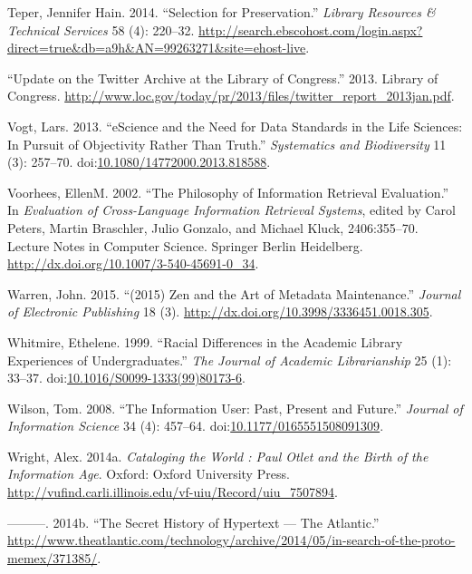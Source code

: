 \documentclass[]{article}
\begin{document}
\hypertarget{ref-teperux5fselectionux5f2014}{}
Teper, Jennifer Hain. 2014. ``Selection for Preservation.''
\emph{Library Resources \& Technical Services} 58 (4): 220--32.
\url{http://search.ebscohost.com/login.aspx?direct=true\&db=a9h\&AN=99263271\&site=ehost-live}.

\hypertarget{ref-ux5fupdateux5f2013}{}
``Update on the Twitter Archive at the Library of Congress.'' 2013.
Library of Congress.
\url{http://www.loc.gov/today/pr/2013/files/twitter_report_2013jan.pdf}.

\hypertarget{ref-vogtux5fescienceux5f2013}{}
Vogt, Lars. 2013. ``eScience and the Need for Data Standards in the Life
Sciences: In Pursuit of Objectivity Rather Than Truth.''
\emph{Systematics and Biodiversity} 11 (3): 257--70.
doi:\href{https://doi.org/10.1080/14772000.2013.818588}{10.1080/14772000.2013.818588}.

\hypertarget{ref-petersux5fphilosophyux5f2002}{}
Voorhees, EllenM. 2002. ``The Philosophy of Information Retrieval
Evaluation.'' In \emph{Evaluation of Cross-Language Information
Retrieval Systems}, edited by Carol Peters, Martin Braschler, Julio
Gonzalo, and Michael Kluck, 2406:355--70. Lecture Notes in Computer
Science. Springer Berlin Heidelberg.
\url{http://dx.doi.org/10.1007/3-540-45691-0_34}.

\hypertarget{ref-warrenux5f2015ux5f2015}{}
Warren, John. 2015. ``(2015) Zen and the Art of Metadata Maintenance.''
\emph{Journal of Electronic Publishing} 18 (3).
\url{http://dx.doi.org/10.3998/3336451.0018.305}.

\hypertarget{ref-whitmireux5fracialux5f1999}{}
Whitmire, Ethelene. 1999. ``Racial Differences in the Academic Library
Experiences of Undergraduates.'' \emph{The Journal of Academic
Librarianship} 25 (1): 33--37.
doi:\href{https://doi.org/10.1016/S0099-1333(99)80173-6}{10.1016/S0099-1333(99)80173-6}.

\hypertarget{ref-wilsonux5finformationux5f2008}{}
Wilson, Tom. 2008. ``The Information User: Past, Present and Future.''
\emph{Journal of Information Science} 34 (4): 457--64.
doi:\href{https://doi.org/10.1177/0165551508091309}{10.1177/0165551508091309}.

\hypertarget{ref-wrightux5fcatalogingux5f2014}{}
Wright, Alex. 2014a. \emph{Cataloging the World : Paul Otlet and the
Birth of the Information Age}. Oxford: Oxford University Press.
\url{http://vufind.carli.illinois.edu/vf-uiu/Record/uiu_7507894}.

\hypertarget{ref-wrightux5fsecretux5f2014}{}
---------. 2014b. ``The Secret History of Hypertext --- The Atlantic.''
\url{http://www.theatlantic.com/technology/archive/2014/05/in-search-of-the-proto-memex/371385/}.
\end{document}
